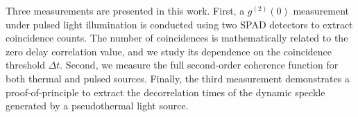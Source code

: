 Three measurements are presented in this work. 
First, a $g^{(2)}(0)$ measurement under pulsed light illumination is conducted using two SPAD detectors to extract coincidence counts. 
The number of coincidences is mathematically related to the zero delay correlation value, and we study its dependence on the coincidence threshold $\Delta t$.
Second, we measure the full second-order coherence function for both thermal and pulsed sources. 
Finally, the third measurement demonstrates a proof-of-principle to extract the decorrelation times of the dynamic speckle generated by a pseudothermal light source.




